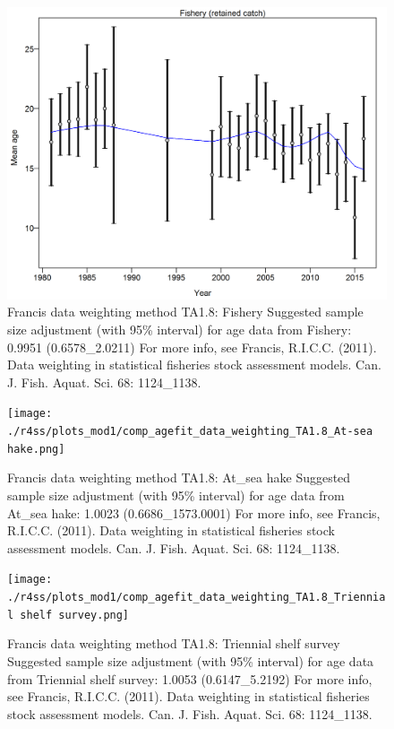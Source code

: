 \documentclass[12pt,]{article}
\begin{document}
\begin{figure}
\centering
\includegraphics{./r4ss/plots_mod1/comp_agefit_data_weighting_TA1.8_Fishery.png}
\caption{Francis data weighting method TA1.8: Fishery Suggested sample
size adjustment (with 95\% interval) for age data from Fishery: 0.9951
(0.6578\_2.0211) For more info, see Francis, R.I.C.C. (2011). Data
weighting in statistical fisheries stock assessment models. Can. J.
Fish. Aquat. Sci. 68: 1124\_1138. \label{fig:weighting_fishery}}
\end{figure}

\begin{figure}
\centering
\texttt{[image: ./r4ss/plots\_mod1/comp\_agefit\_data\_weighting\_TA1.8\_At-sea hake.png]}
\caption{Francis data weighting method TA1.8: At\_sea hake Suggested
sample size adjustment (with 95\% interval) for age data from At\_sea
hake: 1.0023 (0.6686\_1573.0001) For more info, see Francis, R.I.C.C.
(2011). Data weighting in statistical fisheries stock assessment models.
Can. J. Fish. Aquat. Sci. 68: 1124\_1138. \label{fig:weighting_ashop}}
\end{figure}

\begin{figure}
\centering
\texttt{[image: ./r4ss/plots\_mod1/comp\_agefit\_data\_weighting\_TA1.8\_Triennial shelf survey.png]}
\caption{Francis data weighting method TA1.8: Triennial shelf survey
Suggested sample size adjustment (with 95\% interval) for age data from
Triennial shelf survey: 1.0053 (0.6147\_5.2192) For more info, see
Francis, R.I.C.C. (2011). Data weighting in statistical fisheries stock
assessment models. Can. J. Fish. Aquat. Sci. 68: 1124\_1138.
\label{fig:weighting_triennial}}
\end{figure}
\end{document}
